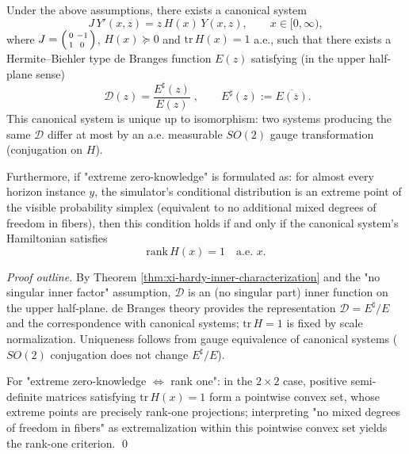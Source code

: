 \begin{theorem}\label{thm:xi-debranges-canonical-extreme-zk}
Under the above assumptions, there exists a canonical system
\[
J\,Y'(x,z)=z\,H(x)\,Y(x,z),\qquad x\in[0,\infty),
\]
where
\(
J=\begin{psmallmatrix}0&-1\\[2pt]1&0\end{psmallmatrix}
\), \(H(x)\succeq 0\) and \(\mathrm{tr}\,H(x)=1\) a.e.,
such that there exists a Hermite--Biehler type de Branges function \(E(z)\) satisfying (in the upper half-plane sense)
\[
\boxed{\;\mathcal{D}(z)=\frac{E^\sharp(z)}{E(z)}\;},
\qquad
E^\sharp(z):=\overline{E(\overline z)}.
\]
This canonical system is unique up to isomorphism: two systems producing the same \(\mathcal{D}\) differ at most by an a.e. measurable \(SO(2)\) gauge transformation (conjugation on \(H\)).
\par
Furthermore, if "extreme zero-knowledge" is formulated as: for almost every horizon instance \(y\), the simulator's conditional distribution is an extreme point of the visible probability simplex (equivalent to no additional mixed degrees of freedom in fibers),
then this condition holds if and only if the canonical system's Hamiltonian satisfies
\[
\boxed{\;\mathrm{rank}\,H(x)=1\quad\text{a.e. }x.\;}
\]
\end{theorem}
\begin{proof}[Proof outline]
By Theorem \ref{thm:xi-hardy-inner-characterization} and the "no singular inner factor" assumption, \(\mathcal{D}\) is an (no singular part) inner function on the upper half-plane.
de Branges theory provides the representation \(\mathcal{D}=E^\sharp/E\) and the correspondence with canonical systems; \(\mathrm{tr}\,H=1\) is fixed by scale normalization.
Uniqueness follows from gauge equivalence of canonical systems (\(SO(2)\) conjugation does not change \(E^\sharp/E\)).
\par
For "extreme zero-knowledge \(\Leftrightarrow\) rank one": in the \(2\times 2\) case, positive semi-definite matrices satisfying \(\mathrm{tr}\,H(x)=1\) form a pointwise convex set, whose extreme points are precisely rank-one projections; interpreting "no mixed degrees of freedom in fibers" as extremalization within this pointwise convex set yields the rank-one criterion. \qed
\end{proof}

